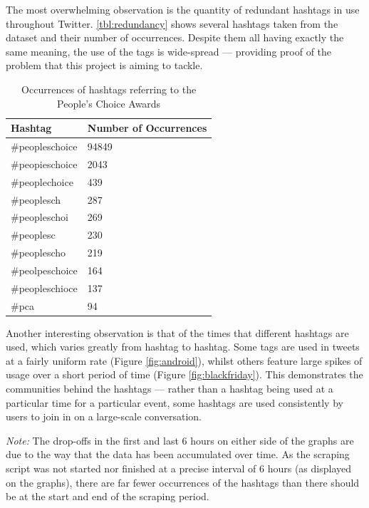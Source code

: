 \documentclass[12pt,a4paper]{article}
\begin{document}
The most overwhelming observation is the quantity of redundant hashtags in use throughout Twitter. \autoref{tbl:redundancy} shows several hashtags taken from the dataset and their number of occurrences. Despite them all having exactly the same meaning, the use of the tags is wide-spread --- providing proof of the problem that this project is aiming to tackle.

\begin{table}[H]
    \centering
    \begin{tabular}{| l | l |}
        \hline
        \textbf{Hashtag} & \textbf{Number of Occurrences} \\
        \hline \hline
        \#peopleschoice & 94849 \\ \hline
        \#peopieschoice & 2043 \\ \hline
        \#peoplechoice  & 439 \\ \hline
        \#peoplesch     & 287 \\ \hline
        \#peopleschoi   & 269 \\ \hline
        \#peoplesc      & 230 \\ \hline
        \#peoplescho    & 219 \\ \hline
        \#peolpeschoice & 164 \\ \hline
        \#peopleschioce & 137 \\ \hline
        \#pca           & 94 \\ \hline
    \end{tabular}
    \caption{Occurrences of hashtags referring to the People's Choice Awards}
    \label{tbl:redundancy}
\end{table}

Another interesting observation is that of the times that different hashtags are used, which varies greatly from hashtag to hashtag. Some tags are used in tweets at a fairly uniform rate (Figure \autoref{fig:android}), whilst others feature large spikes of usage over a short period of time (Figure \autoref{fig:blackfriday}). This demonstrates the communities behind the hashtags --- rather than a hashtag being used at a particular time for a particular event, some hashtags are used consistently by users to join in on a large-scale conversation.

\emph{Note:} The drop-offs in the first and last 6 hours on either side of the graphs are due to the way that the data has been accumulated over time. As the scraping script was not started nor finished at a precise interval of 6 hours (as displayed on the graphs), there are far fewer occurrences of the hashtags than there should be at the start and end of the scraping period.
\end{document}
